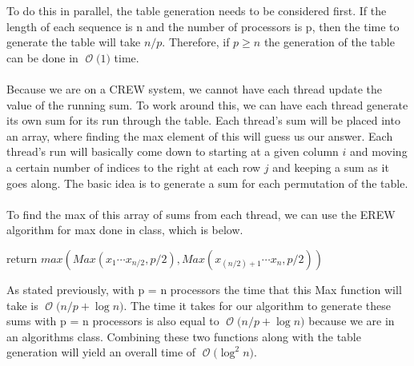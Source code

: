 \documentclass[12pt]{article}
\newcommand{\BigO}[1]{\ensuremath{\operatorname{\mathcal{O}}\bigl(#1\bigr)}}
\begin{document}
To do this in parallel, the table generation needs to be considered first. If the length of each sequence is n and the number of processors is p, then the time to generate the table will take {$n/p$}. Therefore, if {$p \geq n$} the generation of the table can be done in \BigO 1 time.\\\\
Because we are on a CREW system, we cannot have each thread update the value of the running sum. To work around this, we can have each thread generate its own sum for its run through the table. Each thread's sum will be placed into an array, where finding the max element of this will guess us our answer. Each thread's run will basically come down to starting at a given column {$i$} and moving a certain number of indices to the right at each row {$j$} and keeping a sum as it goes along. The basic idea is to generate a sum for each permutation of the table.\\\\
To find the max of this array of sums from each thread, we can use the EREW algorithm for max done in class, which is below.\\
\begin{algorithm}[H]
return {$max (Max(x_1 \cdots x_{n/2}, p/2), Max(x_{(n/2) +1} \cdots x_n, p/2))$}
\end{algorithm}
As stated previously, with p = n processors the time that this Max function will take is \BigO {n/p + \log n}. The time it takes for our algorithm to generate these sums with p = n processors is also equal to \BigO {n/p + \log n} because we are in an algorithms class. Combining these two functions along with the table generation will yield an overall time of \BigO {\log^2 n}.
\end{document}
